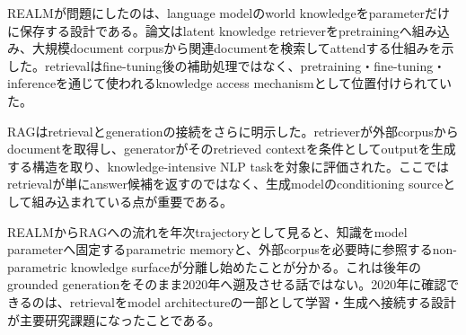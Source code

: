 REALMが問題にしたのは、language modelのworld knowledgeをparameterだけに保存する設計である。論文はlatent knowledge retrieverをpretrainingへ組み込み、大規模document corpusから関連documentを検索してattendする仕組みを示した。retrievalはfine-tuning後の補助処理ではなく、pretraining・fine-tuning・inferenceを通じて使われるknowledge access mechanismとして位置付けられていた。\autocite{src-4bf65d8fc7dc}


RAGはretrievalとgenerationの接続をさらに明示した。retrieverが外部corpusからdocumentを取得し、generatorがそのretrieved contextを条件としてoutputを生成する構造を取り、knowledge-intensive NLP taskを対象に評価された。ここではretrievalが単にanswer候補を返すのではなく、生成modelのconditioning sourceとして組み込まれている点が重要である。\autocite{src-38c08ba169f1,src-c441b6f2b8f4}


REALMからRAGへの流れを年次trajectoryとして見ると、知識をmodel parameterへ固定するparametric memoryと、外部corpusを必要時に参照するnon-parametric knowledge surfaceが分離し始めたことが分かる。これは後年のgrounded generationをそのまま2020年へ遡及させる話ではない。2020年に確認できるのは、retrievalをmodel architectureの一部として学習・生成へ接続する設計が主要研究課題になったことである。\autocite{src-38c08ba169f1,src-4bf65d8fc7dc,src-c441b6f2b8f4}


